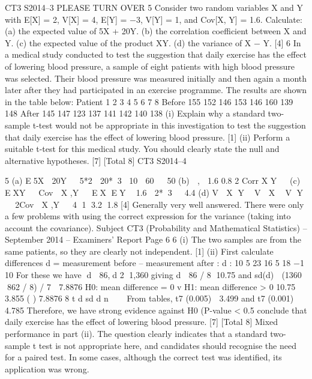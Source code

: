 
CT3 S2014–3 PLEASE TURN OVER
5 Consider two random variables X and Y with E[X] = 2, V[X] = 4, E[Y] = −3, V[Y] = 1,
and Cov[X, Y] = 1.6.
Calculate:
(a) the expected value of 5X + 20Y.
(b) the correlation coefficient between X and Y.
(c) the expected value of the product XY.
(d) the variance of X − Y.
[4]
6 In a medical study conducted to test the suggestion that daily exercise has the effect of
lowering blood pressure, a sample of eight patients with high blood pressure was
selected. Their blood pressure was measured initially and then again a month later
after they had participated in an exercise programme. The results are shown in the
table below:
Patient 1 2 3 4 5 6 7 8
Before 155 152 146 153 146 160 139 148
After 145 147 123 137 141 142 140 138
(i) Explain why a standard two-sample t-test would not be appropriate in this
investigation to test the suggestion that daily exercise has the effect of
lowering blood pressure. [1]
(ii) Perform a suitable t-test for this medical study. You should clearly state the
null and alternative hypotheses. [7]
[Total 8]
CT3 S2014–4


5 (a) E5X  20Y   5*2  20*3 10  60   50
(b)  ,  1.6 0.8
2
Corr X Y  
(c) EXY   Cov  X ,Y   EX EY  1.6  2*3  4.4
(d) V  X Y  V  X  V Y   2Cov  X ,Y   4 1 3.2 1.8
[4]
Generally very well answered. There were only a few problems with using the correct
expression for the variance (taking into account the covariance).
Subject CT3 (Probability and Mathematical Statistics) – September 2014 – Examiners’ Report
Page 6
6 (i) The two samples are from the same patients, so they are clearly not
independent. [1]
(ii) First calculate differences d = measurement before – measurement after :
  d : 10 5 23 16 5 18 −1 10
For these we have d  86,d 2 1,360
giving d  86 / 8 10.75 and sd(d)  (1360 862 / 8) / 7  7.8876
H0: mean difference = 0 v H1: mean difference > 0
10.75 3.855
( ) 7.8876 8
t d
sd d n
  
From tables, t7 (0.005)  3.499 and t7 (0.001)  4.785
Therefore, we have strong evidence against H0 (P-value < 0.5%
conclude that daily exercise has the effect of lowering blood pressure. [7]
[Total 8]
Mixed performance in part (ii). The question clearly indicates that a standard two-sample t
test is not appropriate here, and candidates should recognise the need for a paired test. In
some cases, although the correct test was identified, its application was wrong.
